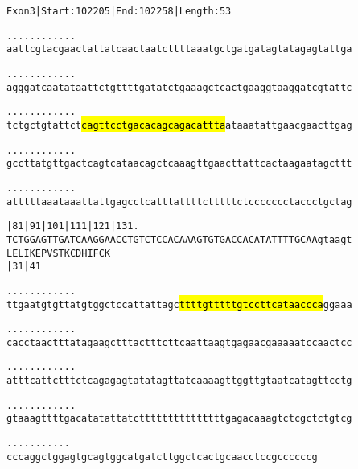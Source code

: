 \documentclass{article}
\begin{document}
\newpage
\begin{alltt}
Exon 3 | Start: 102205 | End: 102258 | Length: 53

.    .    .    .    .    .    .    .    .    .    .    .    
aattcgtacgaactattatcaactaatcttttaaatgctgatgatagtatagagtattga

.    .    .    .    .    .    .    .    .    .    .    .    
agggatcaatataattctgttttgatatctgaaagctcactgaaggtaaggatcgtattc

.    .    .    .    .    .    .    .    .    .    .    .    
tctgctgtattct\hl{cagttcctgacacagcagacattta}ataaatattgaacgaacttgag

.    .    .    .    .    .    .    .    .    .    .    .    
gccttatgttgactcagtcataacagctcaaagttgaacttattcactaagaatagcttt

.    .    .    .    .    .    .    .    .    .    .    .    
atttttaaataaattattgagcctcatttattttctttttctccccccctaccctgctag

|81       |91       |101      |111      |121      |131    . 
TCTGGAGTTGATCAAGGAACCTGTCTCCACAAAGTGTGACCACATATTTTGCAAgtaagt
 L  E  L  I  K  E  P  V  S  T  K  C  D  H  I  F  C  K       
          |31                           |41                 

   .    .    .    .    .    .    .    .    .    .    .    . 
ttgaatgtgttatgtggctccattattagc\hl{ttttgtttttgtccttcataaccca}ggaaa

   .    .    .    .    .    .    .    .    .    .    .    . 
cacctaactttatagaagctttactttcttcaattaagtgagaacgaaaaatccaactcc

   .    .    .    .    .    .    .    .    .    .    .    . 
atttcattctttctcagagagtatatagttatcaaaagttggttgtaatcatagttcctg

   .    .    .    .    .    .    .    .    .    .    .    . 
gtaaagttttgacatatattatctttttttttttttttgagacaaagtctcgctctgtcg

   .    .    .    .    .    .    .    .    .    .    .
cccaggctggagtgcagtggcatgatcttggctcactgcaacctccgccccccg
\end{alltt}
\newpage
\end{document}
